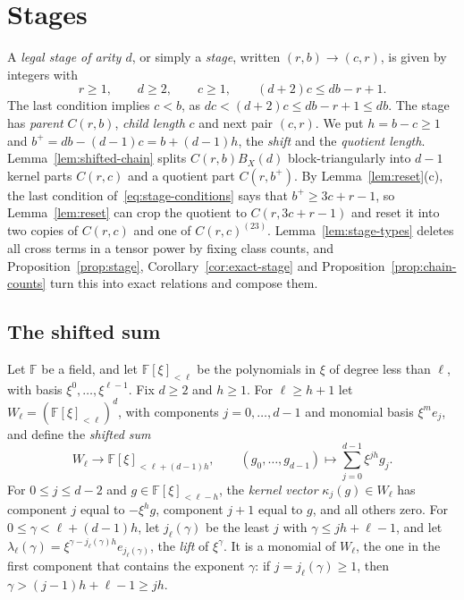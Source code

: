 \section{Stages}
\label{sec:stages}

A \emph{legal stage of arity \(d\)}, or simply a \emph{stage}, written
\((r,b)\to(c,r)\), is given by integers with
\begin{equation}\label{eq:stage-conditions}
 r\ge1,\qquad d\ge2,\qquad c\ge1,\qquad (d+2)c\le db-r+1 .
\end{equation}
The last condition implies \(c<b\), as \(dc<(d+2)c\le db-r+1\le db\).
The stage
has \emph{parent} \(C(r,b)\), \emph{child length} \(c\) and next pair
\((c,r)\). We put \(h=b-c\ge1\) and \(b^+=db-(d-1)c=b+(d-1)h\), the
\emph{shift} and the \emph{quotient length}.
Lemma~\ref{lem:shifted-chain} splits \(C(r,b)B_X(d)\)
block-triangularly into \(d-1\) kernel parts \(C(r,c)\) and a quotient
part \(C(r,b^+)\). By Lemma~\ref{lem:reset}(c), the last condition
of~\eqref{eq:stage-conditions} says that \(b^+\ge3c+r-1\), so
Lemma~\ref{lem:reset} can crop the quotient to \(C(r,3c+r-1)\) and
reset it into two copies of \(C(r,c)\) and one of \(C(r,c)^{(23)}\).
Lemma~\ref{lem:stage-types} deletes all cross terms in a tensor power by
fixing class counts, and Proposition~\ref{prop:stage},
Corollary~\ref{cor:exact-stage} and Proposition~\ref{prop:chain-counts}
turn this into exact relations and compose them.

\subsection{The shifted sum}
\label{subsec:shifted-chain}

Let \(\mathbb F\) be a field, and let \(\mathbb F[\xi]_{<\ell}\) be the
polynomials in \(\xi\) of degree less than \(\ell\), with basis
\(\xi^0,\ldots,\xi^{\ell-1}\). Fix \(d\ge2\) and \(h\ge1\). For
\(\ell\ge h+1\) let \(W_\ell=(\mathbb F[\xi]_{<\ell})^d\), with
components \(j=0,\ldots,d-1\) and monomial basis \(\xi^me_j\), and define
the \emph{shifted sum}
\[
 W_\ell\to\mathbb F[\xi]_{<\ell+(d-1)h},\qquad
 (g_0,\ldots,g_{d-1})\longmapsto\sum_{j=0}^{d-1}\xi^{jh}g_j .
\]
For \(0\le j\le d-2\) and \(g\in\mathbb F[\xi]_{<\ell-h}\), the
\emph{kernel vector} \(\kappa_j(g)\in W_\ell\) has component \(j\) equal
to \(-\xi^hg\), component \(j+1\) equal to \(g\), and all others zero.
For \(0\le\gamma<\ell+(d-1)h\), let \(j_\ell(\gamma)\) be the least \(j\)
with \(\gamma\le jh+\ell-1\), and let
\(\lambda_\ell(\gamma)=\xi^{\gamma-j_\ell(\gamma)h}e_{j_\ell(\gamma)}\),
the \emph{lift} of \(\xi^\gamma\). It is a monomial of \(W_\ell\), the
one in the first component that contains the exponent \(\gamma\): if
\(j=j_\ell(\gamma)\ge1\), then \(\gamma>(j-1)h+\ell-1\ge jh\).

